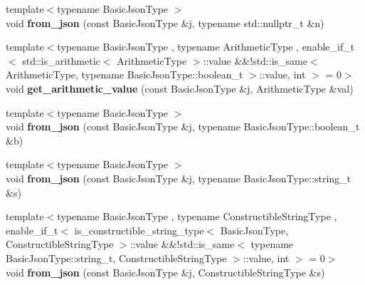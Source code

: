 \begin{DoxyCompactItemize}
\item 
\mbox{\label{namespacenlohmann_1_1detail_a1f0395aad0fe853a4539288749d3a603}} 
{\footnotesize template$<$typename Basic\+Json\+Type $>$ }\\void {\bfseries from\+\_\+json} (const Basic\+Json\+Type \&j, typename std\+::nullptr\+\_\+t \&n)
\item 
\mbox{\label{namespacenlohmann_1_1detail_a85955b9c6dd31846e4b8e891f78614b6}} 
{\footnotesize template$<$typename Basic\+Json\+Type , typename Arithmetic\+Type , enable\+\_\+if\+\_\+t$<$ std\+::is\+\_\+arithmetic$<$ Arithmetic\+Type $>$\+::value \&\&!std\+::is\+\_\+same$<$ Arithmetic\+Type, typename Basic\+Json\+Type\+::boolean\+\_\+t $>$\+::value, int $>$  = 0$>$ }\\void {\bfseries get\+\_\+arithmetic\+\_\+value} (const Basic\+Json\+Type \&j, Arithmetic\+Type \&val)
\item 
\mbox{\label{namespacenlohmann_1_1detail_a58117f225f43d03e3a0a4a6f3d77c9d9}} 
{\footnotesize template$<$typename Basic\+Json\+Type $>$ }\\void {\bfseries from\+\_\+json} (const Basic\+Json\+Type \&j, typename Basic\+Json\+Type\+::boolean\+\_\+t \&b)
\item 
\mbox{\label{namespacenlohmann_1_1detail_ad74d89f77ada7a57eff38b43d4bf2335}} 
{\footnotesize template$<$typename Basic\+Json\+Type $>$ }\\void {\bfseries from\+\_\+json} (const Basic\+Json\+Type \&j, typename Basic\+Json\+Type\+::string\+\_\+t \&s)
\item 
\mbox{\label{namespacenlohmann_1_1detail_a2932f2bc2943dac6d51669312f4fc0f5}} 
{\footnotesize template$<$typename Basic\+Json\+Type , typename Constructible\+String\+Type , enable\+\_\+if\+\_\+t$<$ is\+\_\+constructible\+\_\+string\+\_\+type$<$ Basic\+Json\+Type, Constructible\+String\+Type $>$\+::value \&\&!std\+::is\+\_\+same$<$ typename Basic\+Json\+Type\+::string\+\_\+t, Constructible\+String\+Type $>$\+::value, int $>$  = 0$>$ }\\void {\bfseries from\+\_\+json} (const Basic\+Json\+Type \&j, Constructible\+String\+Type \&s)
\item 
\mbox{\label{namespacenlohmann_1_1detail_a7cb5dd7d46a60e65f9a8e0873b3f7dd8}} 

\end{DoxyCompactItemize}
